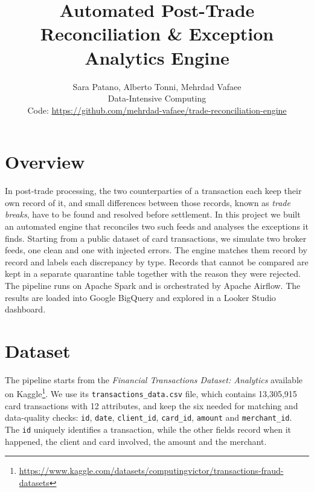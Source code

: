 \documentclass[11pt,a4paper]{article}
\title{\vspace{-1.5cm}Automated Post-Trade Reconciliation \& Exception Analytics Engine}
\author{Sara Patano, Alberto Tonni, Mehrdad Vafaee\\\small Data-Intensive Computing\\\small Code: \url{https://github.com/mehrdad-vafaee/trade-reconciliation-engine}}
\date{}
\newcommand{\code}[1]{\texttt{#1}}
\begin{document}
\maketitle
\vspace{-1.2cm}

\section{Overview}
In post-trade processing, the two counterparties of a transaction each keep their own record of it, and small differences between those records, known as \emph{trade breaks}, have to be found and resolved before settlement.
In this project we built an automated engine that reconciles two such feeds and analyses the exceptions it finds.
Starting from a public dataset of card transactions, we simulate two broker feeds, one clean and one with injected errors.
The engine matches them record by record and labels each discrepancy by type.
Records that cannot be compared are kept in a separate quarantine table together with the reason they were rejected.
The pipeline runs on Apache Spark and is orchestrated by Apache Airflow.
The results are loaded into Google BigQuery and explored in a Looker Studio dashboard.

\section{Dataset}
The pipeline starts from the \emph{Financial Transactions Dataset: Analytics} available on Kaggle\footnote{\url{https://www.kaggle.com/datasets/computingvictor/transactions-fraud-datasets}}.
We use its \code{transactions\_data.csv} file, which contains 13,305,915 card transactions with 12 attributes, and keep the six needed for matching and data-quality checks: \code{id}, \code{date}, \code{client\_id}, \code{card\_id}, \code{amount} and \code{merchant\_id}.
The \code{id} uniquely identifies a transaction, while the other fields record when it happened, the client and card involved, the amount and the merchant.
\end{document}
